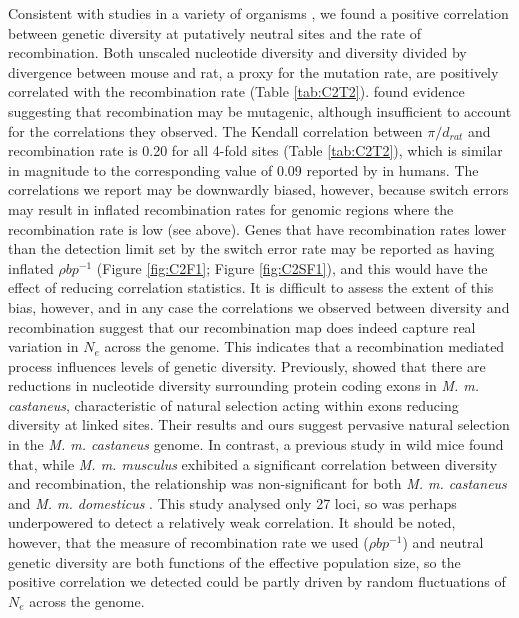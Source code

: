 	Consistent with studies in a variety of organisms \citep{RN117}, we found a positive correlation between genetic diversity at putatively neutral sites and the rate of recombination. Both unscaled nucleotide diversity and diversity divided by divergence between mouse and rat, a proxy for the mutation rate, are positively correlated with the recombination rate (Table \ref{tab:C2T2}). \cite{RN168} found evidence suggesting that recombination may be mutagenic, although insufficient to account for the correlations they observed. The Kendall correlation between $\pi/d_{rat}$ and recombination rate is 0.20 for all 4-fold sites (Table \ref{tab:C2T2}), which is similar in magnitude to the corresponding value of 0.09 reported by \cite{RN168} in humans. The correlations we report may be downwardly biased, however, because switch errors may result in inflated recombination rates for genomic regions where the recombination rate is low (see above). Genes that have recombination rates lower than the detection limit set by the switch error rate may be reported as having inflated $\rho bp^{-1}$ (Figure \ref{fig:C2F1}; Figure \ref{fig:C2SF1}), and this would have the effect of reducing correlation statistics. It is difficult to assess the extent of this bias, however, and in any case the correlations we observed between diversity and recombination suggest that our recombination map does indeed capture real variation in $N_e$ across the genome. This indicates that a recombination mediated process influences levels of genetic diversity. Previously, \cite{RN122} showed that there are reductions in nucleotide diversity surrounding protein coding exons in \textit{M. m. castaneus}, characteristic of natural selection acting within exons reducing diversity at linked sites. Their results and ours suggest pervasive natural selection in the \textit{M. m. castaneus} genome. In contrast, a previous study in wild mice found that, while \textit{M. m. musculus} exhibited a significant correlation between diversity and recombination, the relationship was non-significant for both \textit{M. m. castaneus} and \textit{M. m. domesticus} \citep{RN315}. This study analysed only 27 loci, so was perhaps underpowered to detect a relatively weak correlation. It should be noted, however, that the measure of recombination rate we used ($\rho bp^{-1}$) and neutral genetic diversity are both functions of the effective population size, so the positive correlation we detected could be partly driven by random fluctuations of $N_e$ across the genome.

